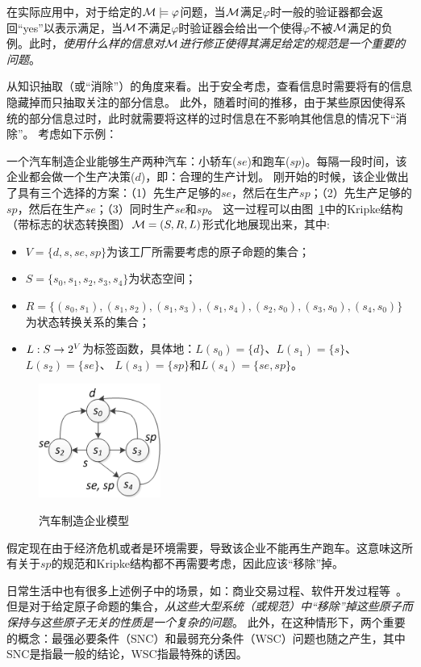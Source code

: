 在实际应用中，对于给定的${\cal M}\models \varphi$问题，当${\cal M}$满足$\varphi$时一般的验证器都会返回“yes”以表示满足，当${\cal M}$不满足$\varphi$时验证器会给出一个使得$\varphi$不被${\cal M}$满足的负例。此时，\emph{使用什么样的信息对${\cal M}$进行修正使得其满足给定的规范是一个重要的问题}。

从知识抽取（或“消除”）的角度来看。出于安全考虑，查看信息时需要将有的信息隐藏掉而只抽取关注的部分信息。
此外，随着时间的推移，由于某些原因使得系统的部分信息过时，此时就需要将这样的过时信息在不影响其他信息的情况下“消除”。
考虑如下示例：
\begin{example}[汽车制造企业模型]\label{car_manufacturing}
	一个汽车制造企业能够生产两种汽车：小轿车($se$)和跑车($sp$)。每隔一段时间，该企业都会做一个生产决策($d$)，即：合理的生产计划。
	刚开始的时候，该企业做出了具有三个选择的方案：（1）先生产足够的$se$，然后在生产$sp$；（2）先生产足够的$sp$，然后在生产$se$；（3）同时生产$se$和$sp$。
	这一过程可以由图~\ref{BVM}中的Kripke结构（带标志的状态转换图）${\cal M}=(S,R,L)$形式化地展现出来，其中:
	\begin{itemize}
		\item $V=\{d,s, se, sp\}$为该工厂所需要考虑的原子命题的集合；
		\item $S=\{s_0,s_1,s_2,s_3,s_4\}$为状态空间；
		\item $R = \{(s_0, s_1), (s_1,s_2), (s_1,s_3), (s_1,s_4), (s_2,s_0), (s_3,s_0),(s_4,s_0)\}$为状态转换关系的集合；
		\item $L: S \rightarrow 2^V$为标签函数，具体地：$L(s_0) = \{d\}$、$L(s_1) = \{s\}$、 $L(s_2)=\{se\}$、 $L(s_3) = \{sp\}$和$L(s_4) = \{se,sp\}$。
	\end{itemize}
	\begin{figure}[ht]
		\centering
		\includegraphics[width=4cm]{NnewCar.png}\\
		\caption{汽车制造企业模型}\label{BVM}
	\end{figure}

假定现在由于经济危机或者是环境需要，导致该企业不能再生产跑车。这意味这所有关于$sp$的规范和Kripke结构都不再需要考虑，因此应该“移除”掉。
\end{example}

日常生活中也有很多上述例子中的场景，如：商业交易过程、软件开发过程等~\cite{Baier:PMC:2008}。
但是对于给定原子命题的集合，\emph{从这些大型系统（或规范）中“移除”掉这些原子而保持与这些原子无关的性质是一个复杂的问题}。
此外，在这种情形下，两个重要的概念：最强必要条件（SNC）和最弱充分条件（WSC）问题也随之产生，其中SNC是指最一般的结论，WSC指最特殊的诱因。

